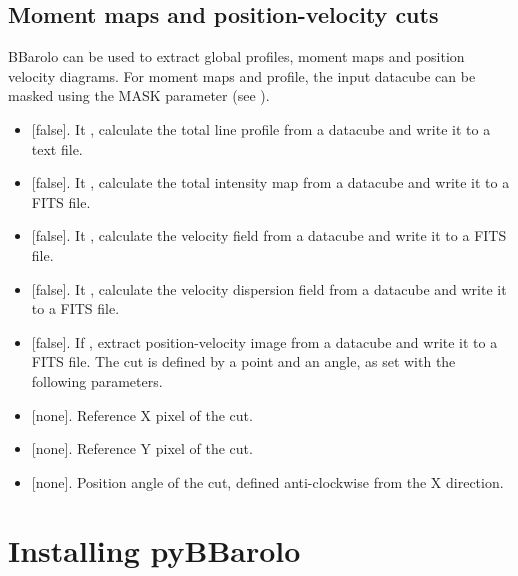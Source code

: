 \documentclass[letterpaper,10pt,english]{sphinxmanual}
\begin{document}
\section{Moment maps and position-velocity cuts}
\label{\detokenize{tasks:moment-maps-and-position-velocity-cuts}}\label{\detokenize{tasks:momentstask}}
BBarolo can be used to extract global profiles, moment maps and position velocity diagrams. For moment maps and profile, the input datacube can be masked using the MASK parameter (see {\hyperref[\detokenize{tasks:dfitopt}]{}}).
\begin{itemize}
\item {} 
 {[}false{]}. It , calculate the total line profile from a datacube and write it to a text file.

\item {} 
 {[}false{]}. It , calculate the total intensity map from a datacube and write it to a FITS file.

\item {} 
 {[}false{]}. It , calculate the velocity field from a datacube and write it to a FITS file.

\item {} 
 {[}false{]}. It , calculate the velocity dispersion field from a datacube and write it to a FITS file.

\item {} 
 {[}false{]}. If , extract position-velocity image from a datacube and write it to a FITS file. The cut is defined by a point and an angle, as set with the following parameters.

\item {} 
 {[}none{]}. Reference X pixel of the cut.

\item {} 
 {[}none{]}. Reference Y pixel of the cut.

\item {} 
 {[}none{]}. Position angle of the cut, defined anti-clockwise from the X direction.

\end{itemize}


\chapter{Installing pyBBarolo}
\label{\detokenize{pybb_install::doc}}\label{\detokenize{pybb_install:installing-pybbarolo}}
\end{document}
